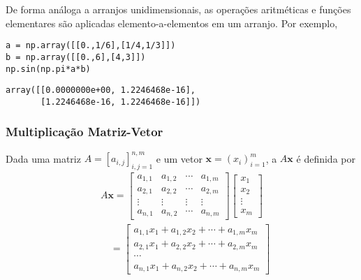 De forma análoga a arranjos unidimensionais, as operações aritméticas e funções elementares são aplicadas elemento-a-elementos em um arranjo. Por exemplo,

\begin{lstlisting}
a = np.array([[0.,1/6],[1/4,1/3]])
b = np.array([[0.,6],[4,3]])
np.sin(np.pi*a*b)
\end{lstlisting}

\begin{verbatim}
array([[0.0000000e+00, 1.2246468e-16],
       [1.2246468e-16, 1.2246468e-16]])
\end{verbatim}

\subsubsection{Multiplicação Matriz-Vetor}

Dada uma matriz $A = [a_{i,j}]_{i,j=1}^{n,m}$ e um vetor $\pmb{x} = (x_i)_{i=1}^m$, a  $A\pmb{x}$ é definida por
\begin{align}
  & A\pmb{x} = \begin{bmatrix}
    a_{1,1} & a_{1,2} & \cdots & a_{1,m}\\
    a_{2,1} & a_{2,2} & \cdots & a_{2,m}\\
    \vdots & \vdots & \vdots & \vdots\\
    a_{n,1} & a_{n,2} & \cdots & a_{n,m}
  \end{bmatrix}\begin{bmatrix}
    x_1\\
    x_2\\
    \vdots\\
    x_m
  \end{bmatrix}\\
  & \text{}\quad =
    \begin{bmatrix}
      a_{1,1}x_1 + a_{1,2}x_2 + \cdots + a_{1,m}x_m\\
      a_{2,1}x_1 + a_{2,2}x_2 + \cdots + a_{2,m}x_m\\
      \cdots\\
      a_{n,1}x_1 + a_{n,2}x_2 + \cdots + a_{n,m}x_m
    \end{bmatrix}
\end{align}

